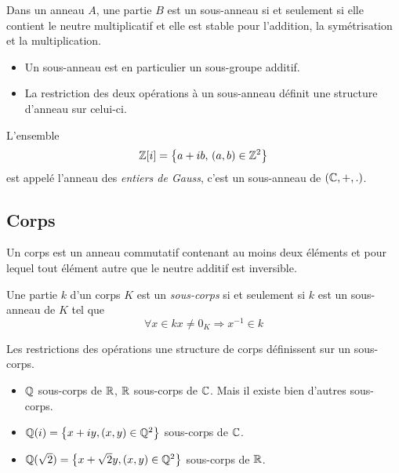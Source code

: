 \begin{defi}
  Dans un anneau $A$, une partie $B$ est un sous-anneau si et seulement si elle contient le neutre multiplicatif et elle est stable pour l'addition, la symétrisation et la multiplication.
\end{defi}
\begin{rems}
\begin{itemize}
  \item Un sous-anneau est en particulier un sous-groupe additif.
  \item La restriction des deux opérations à un sous-anneau définit une structure d'anneau sur celui-ci. 
\end{itemize}
\end{rems}
\begin{exple}
  L'ensemble
\begin{displaymath}
  \mathbb{Z}[i] = \left\lbrace a+ib,\,(a,b)\in \mathbb{Z}^2 \right\rbrace 
\end{displaymath}
est appelé l'anneau des \emph{entiers de Gauss}, c'est un sous-anneau de $(\mathbb{C},+,.)$.
\end{exple}

\subsection{Corps}
\begin{defi}
  Un corps est un anneau commutatif contenant au moins deux éléments et pour lequel tout élément autre que le neutre additif est inversible.
\end{defi}
\begin{defi}
  Une partie $k$ d'un corps $K$ est un \emph{sous-corps} si et seulement si $k$ est un sous-anneau de $K$ tel que 
\begin{displaymath}
  \forall x\in k x\neq 0_K \Rightarrow x^{-1}\in k
\end{displaymath}
\begin{rem}
  Les restrictions des opérations une structure de corps définissent sur un sous-corps. 
\end{rem}
\begin{exples}
\begin{itemize}
  \item $\mathbb{Q}$ sous-corps de $\mathbb{R}$, $\mathbb{R}$ sous-corps de $\mathbb{C}$. Mais il existe bien d'autres sous-corps.
  \item $\mathbb{Q}(i)=\left\lbrace  x+iy, (x,y)\in \mathbb{Q}^2 \right\rbrace$ sous-corps de $\mathbb{C}$.
  \item $\mathbb{Q}(\sqrt{2})=\left\lbrace  x+\sqrt{2}y, (x,y)\in \mathbb{Q}^2 \right\rbrace$ sous-corps de $\mathbb{R}$.
\end{itemize}
\end{exples}

\end{defi}



